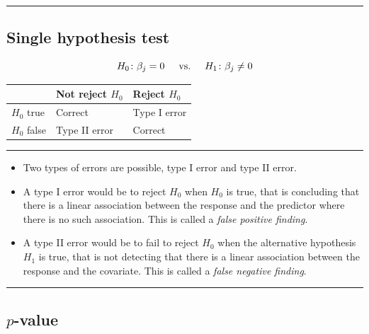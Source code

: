 \documentclass[
  letterpaper,
  DIV=11,
  numbers=noendperiod]{scrartcl}
\providecommand{\tightlist}{%
  \setlength{\itemsep}{0pt}\setlength{\parskip}{0pt}}\usepackage{longtable,booktabs,array}
\begin{document}
\begin{center}\rule{0.5\linewidth}{0.5pt}\end{center}

\hypertarget{single-hypothesis-test}{%
\subsection{Single hypothesis test}\label{single-hypothesis-test}}

\[H_{0}\colon \beta_j=0 \hspace{0.5cm} \text{vs.} \hspace{0.5cm} H_{1}\colon \beta_j \neq 0\]

\begin{longtable}[]{@{}lll@{}}
\toprule()
& Not reject \(H_0\) & Reject \(H_0\) \\
\midrule()
\endhead
\(H_0\) true & Correct & Type I error \\
\(H_0\) false & Type II error & Correct \\
\bottomrule()
\end{longtable}

\begin{center}\rule{0.5\linewidth}{0.5pt}\end{center}

\begin{itemize}
\tightlist
\item
  Two types of errors are possible, type I error and type II error.
\item
  A type I error would be to reject \(H_0\) when \(H_0\) is true, that
  is concluding that there is a linear association between the response
  and the predictor where there is no such association. This is called a
  \emph{false positive finding}.
\item
  A type II error would be to fail to reject \(H_0\) when the
  alternative hypothesis \(H_1\) is true, that is not detecting that
  there is a linear association between the response and the covariate.
  This is called a \emph{false negative finding}.
\end{itemize}

\begin{center}\rule{0.5\linewidth}{0.5pt}\end{center}

\hypertarget{p-value}{%
\subsection{\texorpdfstring{\(p\)-value}{p-value}}\label{p-value}}
\end{document}
